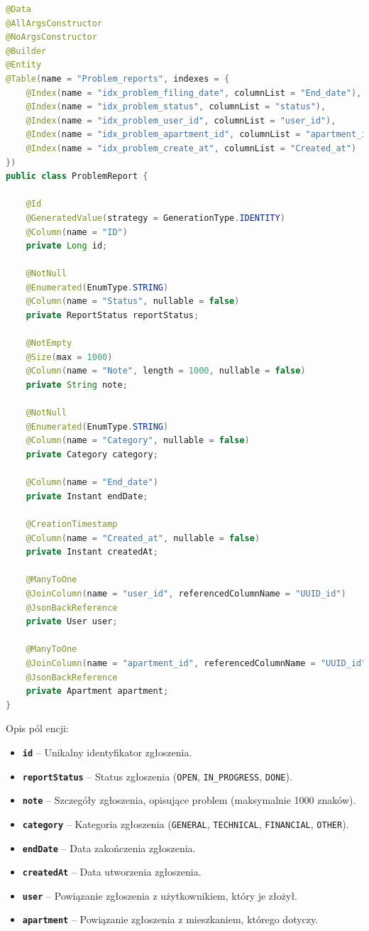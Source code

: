 \begin{lstlisting}[language=Java, style=JavaStyle, caption=Definicja encji \texttt{ProblemReport}]
@Data
@AllArgsConstructor
@NoArgsConstructor
@Builder
@Entity
@Table(name = "Problem_reports", indexes = {
    @Index(name = "idx_problem_filing_date", columnList = "End_date"),
    @Index(name = "idx_problem_status", columnList = "status"),
    @Index(name = "idx_problem_user_id", columnList = "user_id"),
    @Index(name = "idx_problem_apartment_id", columnList = "apartment_id"),
    @Index(name = "idx_problem_create_at", columnList = "Created_at")
})
public class ProblemReport {

    @Id
    @GeneratedValue(strategy = GenerationType.IDENTITY)
    @Column(name = "ID")
    private Long id;

    @NotNull
    @Enumerated(EnumType.STRING)
    @Column(name = "Status", nullable = false)
    private ReportStatus reportStatus;

    @NotEmpty
    @Size(max = 1000)
    @Column(name = "Note", length = 1000, nullable = false)
    private String note;

    @NotNull
    @Enumerated(EnumType.STRING)
    @Column(name = "Category", nullable = false)
    private Category category;

    @Column(name = "End_date")
    private Instant endDate;

    @CreationTimestamp
    @Column(name = "Created_at", nullable = false)
    private Instant createdAt;

    @ManyToOne
    @JoinColumn(name = "user_id", referencedColumnName = "UUID_id")
    @JsonBackReference
    private User user;

    @ManyToOne
    @JoinColumn(name = "apartment_id", referencedColumnName = "UUID_id")
    @JsonBackReference
    private Apartment apartment;
}
\end{lstlisting}

Opis pól encji:
\begin{itemize}
    \item \textbf{\texttt{id}} -- Unikalny identyfikator zgłoszenia.
    \item \textbf{\texttt{reportStatus}} -- Status zgłoszenia (\texttt{OPEN}, \texttt{IN\_PROGRESS}, \texttt{DONE}).
    \item \textbf{\texttt{note}} -- Szczegóły zgłoszenia, opisujące problem (maksymalnie 1000 znaków).
    \item \textbf{\texttt{category}} -- Kategoria zgłoszenia (\texttt{GENERAL}, \texttt{TECHNICAL}, \texttt{FINANCIAL}, \texttt{OTHER}).
    \item \textbf{\texttt{endDate}} -- Data zakończenia zgłoszenia.
    \item \textbf{\texttt{createdAt}} -- Data utworzenia zgłoszenia.
    \item \textbf{\texttt{user}} -- Powiązanie zgłoszenia z użytkownikiem, który je złożył.
    \item \textbf{\texttt{apartment}} -- Powiązanie zgłoszenia z mieszkaniem, którego dotyczy.
\end{itemize}

